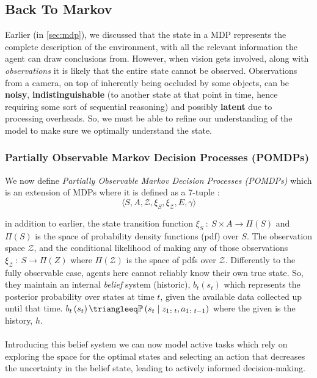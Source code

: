   \subsection{Back To Markov}
  Earlier (in \ref{sec:mdp}), we discussed that the state in a MDP represents the complete description of the environment, with all the relevant information the agent can draw conclusions from. However, when vision gets involved, along with \emph{observations} it is likely that the entire state cannot be observed. Observations from a camera, on top of inherently being occluded by some objects, can be \textbf{noisy}, \textbf{indistinguishable} (to another state at that point in time, hence requiring some sort of sequential reasoning) and possibly \textbf{latent} due to processing overheads. So, we must be able to refine our understanding of the model to make sure we optimally understand the state.

  \subsubsection{Partially Observable Markov Decision
  Processes (POMDPs)}\label{sec:pomdp}
  We now define \emph{Partially Observable Markov Decision Processes (POMDPs)} 
  which is an extension of MDPs where it is defined as a 7-tuple \cite{thrun2002probabilistic,placed2023surveyactivesimultaneouslocalization}: 
  \[\langle S, A, \mathcal{Z}, \xi_S, \xi_{\mathcal{Z}}, E, \gamma \rangle \]
  
  in addition to earlier, the state transition function \( \xi_S ~\colon~ S \times A \rightarrow \Pi\left(S\right)\) and $\Pi\left(S\right)$ is the space of probability density functions (pdf) over $S$. The observation space $\mathcal{Z}$, and the conditional likelihood of making any of those observations \(\xi_{\mathcal{Z}} ~\colon~ S \rightarrow \Pi\left(Z\right)\) where $\Pi\left(\mathcal{Z}\right)$ is the space of pdfs over $\mathcal{Z}$.
  Differently to the fully observable case, agents here cannot reliably know their own true state. So, they maintain an internal \emph{belief} system (historic), $b_t\left(s_t\right)$ which represents the posterior probability over states at time $t$, given the available data collected up until that time. \(b_t\left(s_t\right) \triangleeq  \mathbb{P}\left(s_t \mid z_{1 \colon t}, a_{1 \colon t - 1}\right)\) where the given is the history, $h$.
  \\\\
  Introducing this belief system we can now model active tasks which rely on exploring the space for the optimal states and selecting an action that decreases the uncertainty in the belief state, leading to actively informed decision-making.

